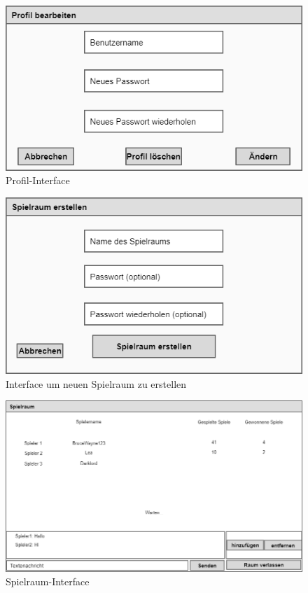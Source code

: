 \begin{figure}
	\centering
	\includegraphics[width=1.1\textwidth]{SEP_Lasten_Pflichtenheft/img/Profil_bearbeiten.png}
	\caption{Profil-Interface}
	\label{gui:profil}
\end{figure}

\begin{figure}
	\centering
	\includegraphics[width=1.1\textwidth]{SEP_Lasten_Pflichtenheft/img/Spielraum_erstellen.png}
	\caption{Interface um neuen Spielraum zu erstellen}
	\label{gui:spielraum_erstellen}
\end{figure}

\begin{figure}
	\centering
	\includegraphics[width=1.1\textwidth]{SEP_Lasten_Pflichtenheft/img/Spielraum.png}
	\caption{Spielraum-Interface}
	\label{gui:spielraum}
\end{figure}

